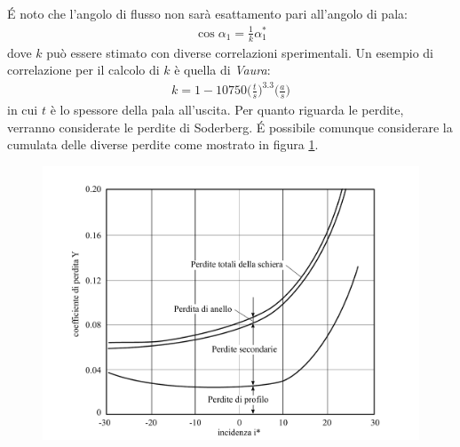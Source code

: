 \'E noto che l'angolo di flusso non sarà esattamento pari all'angolo di pala:
\begin{align*}
\cos \alpha_1 = \frac{1}{k} \alpha_1^*
\end{align*}
dove $k$ può essere stimato con diverse correlazioni sperimentali. Un esempio di correlazione per il calcolo di $k$ è quella di \textit{Vaura}:
\begin{align*}
k = 1 - 10750 \bigg( \frac{t}{s} \bigg)^{3.3} \bigg( \frac{a}{s} \bigg)
\end{align*}
in cui $t$ è lo spessore della pala all'uscita.
Per quanto riguarda le perdite, verranno considerate le perdite di Soderberg. \'E possibile comunque considerare la cumulata delle diverse perdite come mostrato in figura \ref{fig:PerditeSchiera}. 
\begin{figure}
\centering
  \includegraphics[width=.65\textwidth]{fig/PerditeSchiera.pdf}
\caption{}
\label{fig:PerditeSchiera}
\end{figure}
